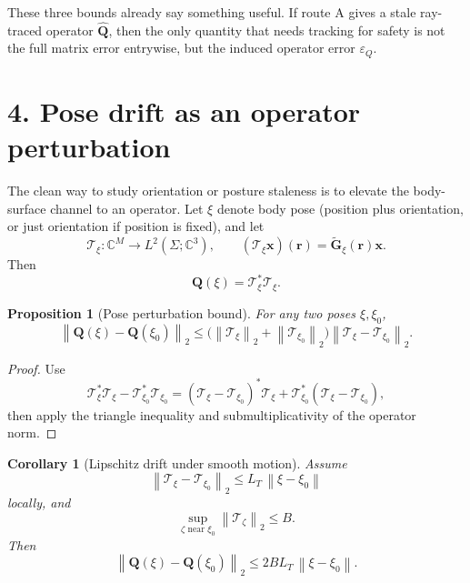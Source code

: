 \documentclass[11pt]{article}
\newtheorem{proposition}{Proposition}
\newtheorem{corollary}{Corollary}
\newcommand{\Complex}{\mathbb{C}}
\newcommand{\QQ}{\mathbf{Q}}
\newcommand{\x}{\mathbf{x}}
\newcommand{\Gh}{\widetilde{\mathbf{G}}}
\newcommand{\norm}[1]{\left\lVert #1 \right\rVert}
\begin{document}
These three bounds already say something useful. If route A gives a stale
ray-traced operator $\widehat{\QQ}$, then the only quantity that needs
tracking for safety is not the full matrix error entrywise, but the induced
operator error $\varepsilon_Q$.

\section*{4. Pose drift as an operator perturbation}

The clean way to study orientation or posture staleness is to elevate the
body-surface channel to an operator. Let $\xi$ denote body pose
(position plus orientation, or just orientation if position is fixed), and
let
\begin{equation}
  \mathcal{T}_\xi:\Complex^M \to L^2(\Sigma;\Complex^3),
  \qquad
  (\mathcal{T}_\xi\x)(\mathbf{r})=\Gh_\xi(\mathbf{r})\x.
\end{equation}
Then
\begin{equation}
  \QQ(\xi)=\mathcal{T}_\xi^*\mathcal{T}_\xi.
\end{equation}

\begin{proposition}[Pose perturbation bound]
For any two poses $\xi,\xi_0$,
\begin{equation}
  \norm{\QQ(\xi)-\QQ(\xi_0)}_2
  \le
  \bigl(\norm{\mathcal{T}_\xi}_2+\norm{\mathcal{T}_{\xi_0}}_2\bigr)
  \norm{\mathcal{T}_\xi-\mathcal{T}_{\xi_0}}_2.
\end{equation}
\end{proposition}

\begin{proof}
Use
\begin{equation}
  \mathcal{T}_\xi^*\mathcal{T}_\xi
  -\mathcal{T}_{\xi_0}^*\mathcal{T}_{\xi_0}
  =
  (\mathcal{T}_\xi-\mathcal{T}_{\xi_0})^*\mathcal{T}_\xi
  + \mathcal{T}_{\xi_0}^*(\mathcal{T}_\xi-\mathcal{T}_{\xi_0}),
\end{equation}
then apply the triangle inequality and submultiplicativity of the operator
norm.
\end{proof}

\begin{corollary}[Lipschitz drift under smooth motion]
Assume
\begin{equation}
  \norm{\mathcal{T}_\xi-\mathcal{T}_{\xi_0}}_2
  \le L_T\,\norm{\xi-\xi_0}
\end{equation}
locally, and
\begin{equation}
  \sup_{\zeta \text{ near } \xi_0}\norm{\mathcal{T}_\zeta}_2 \le B.
\end{equation}
Then
\begin{equation}
  \norm{\QQ(\xi)-\QQ(\xi_0)}_2
  \le 2BL_T\,\norm{\xi-\xi_0}.
\end{equation}
\end{corollary}
\end{document}
